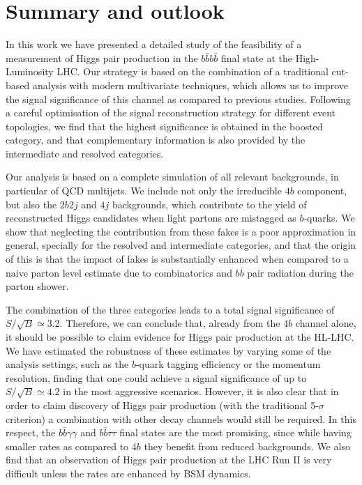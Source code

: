 \section{Summary and outlook}
\label{sec:conclusions}

In this work we have presented a detailed study of the feasibility
of a measurement of Higgs pair production in the $b\bar{b}b\bar{b}$
final state at the High-Luminosity LHC.
%
Our strategy is based on the combination of a traditional
cut-based analysis with modern multivariate techniques,
which allows us to improve the signal significance of this channel
as compared to previous studies.
%
Following a careful optimisation of the
signal reconstruction strategy for different event topologies,
we find that the highest significance is obtained
in the 
boosted category, and that complementary information is also provided
by the intermediate and resolved categories.
%


Our analysis is based on a complete simulation of
all relevant backgrounds, in particular
of QCD multijets.
%
We include not only the irreducible $4b$ component, but
also the $2b2j$ and $4j$ backgrounds, which contribute
to the yield of reconstructed Higgs candidates
when light partons are mistagged as $b$-quarks.
%
We show that neglecting the contribution
from these fakes is a poor approximation
in general, specially for the resolved and intermediate
categories, and that the origin of this is that
the impact of fakes
is substantially enhanced when compared to a naive parton
level estimate due to combinatorics and $b\bar{b}$
pair radiation during the parton shower.

The combination of the three categories leads to a total
signal significance of $S/\sqrt{B}\simeq 3.2$.
%
Therefore, we can conclude that, already from the $4b$ channel alone,
it should be possible to claim evidence for Higgs pair production at
the HL-LHC.
%
We have estimated the robustness of these estimates by varying some
of the analysis settings, such as the $b$-quark tagging efficiency
or the momentum resolution, finding that one could achieve
a signal significance of up to $S/\sqrt{B}\simeq 4.2$ in
the most aggressive scenarios.
%
However, it is also clear that in order
to claim discovery of Higgs pair production
(with the traditional 5-$\sigma$ criterion)
a combination with other decay channels
would still be required.
%
In this respect, the 
 $b\bar{b}\gamma\gamma$
and $b\bar{b}\tau\tau$ final states are the most
promising, since while having
smaller rates as compared to $4b$
they
benefit from reduced backgrounds.
%
We also find that an observation of Higgs pair production at the
LHC Run II is very difficult unless the rates are enhanced
by BSM dynamics.

